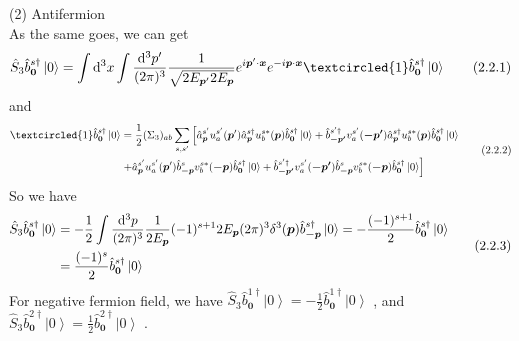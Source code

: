 \documentclass[12pt]{article}
\begin{document}
\begin{spacing}{1.5}
(2) Antifermion \\
As the same goes, we can get\\
\begin{equation}
\hat S_{3}\hat b^{s\dagger}_{\bm0} \left|0\right> = \int\dif^{3}x\int \frac{\dif^{3} p'}{(2\pi)^{3}}\frac{1}{\sqrt{2E_{\bm p'}2E_{\bm p}}}e^{i\bm p' \cdot \bm x}e^{-i\bm p \cdot \bm x} \textcircled{1} \hat b^{s\dagger}_{\bm0} \left|0\right>
	\tag{2.2.1}
\end{equation}
and
\begin{equation}
\begin{aligned}
\textcircled{1}\hat b^{s\dagger}_{\bm0} \left|0\right>  
&= \frac{1}{2}(\Sigma_{3})_{ab} \sum\limits_{s,s'} \left[ { \hat a^{s'}_{\bm p}u^{s'}_{a}(\bm p')\hat a^{s\dagger}_{\bm p}u^{s*}_{b}(\bm p)\hat b^{s\dagger}_{\bm0} \left|0\right>  +\hat b^{s'\dagger}_{\bm{-p'}}v^{s'}_{a}(\bm{-p'})\hat a^{s\dagger}_{\bm p}u^{s*}_{b}(\bm p)\hat b^{s\dagger}_{\bm0} \left|0\right> } \right. \\ & \left. { + \hat a^{s'}_{\bm p}u^{s'}_{a}(\bm p')\hat b^{s}_{\bm{-p}}v^{s*}_{b}(\bm{-p})\hat b^{s\dagger}_{\bm0} \left|0\right> +\hat b^{s'\dagger}_{\bm{-p'}}v^{s'}_{a}(\bm{-p'})\hat b^{s}_{\bm{-p}}v^{s*}_{b}(\bm{-p})\hat b^{s\dagger}_{\bm0} \left|0\right> } \right] 
\end{aligned}
	\tag{2.2.2}
\end{equation}
So we have
\begin{equation}
\begin{aligned}
\hat S_{3}\hat b^{s\dagger}_{\bm0} \left|0\right> &= -\frac{1}{2} \int \frac{\mathop{}\!\mathrm{d}^{3} p}{(2\pi)^{3}}\frac{1}{2E_{\bm p}} (-1)^{s+1}2E_{\bm p}(2\pi)^{3}\delta^{3}(\bm p) \hat b^{s\dagger}_{\bm{-p}} \left|0\right> = -\frac{(-1)^{s+1}}{2}\hat b^{s\dagger}_{\bm 0} \left|0\right> \\
&=\frac{(-1)^{s}}{2}\hat b^{s\dagger}_{\bm 0} \left|0\right>
\end{aligned}
	\tag{2.2.3}
\end{equation}
For negative fermion field, we have $\displaystyle \hat S_{3}\hat b^{1\dagger}_{\bm0} \left|0\right> = -\frac{1}{2} \hat b^{1\dagger}_{\bm0} \left|0\right>$ , and $\displaystyle \hat S_{3}\hat b^{2\dagger}_{\bm0} \left|0\right> = \frac{1}{2} \hat b^{2\dagger}_{\bm0} \left|0\right> $ .\\
~\\
~\\
~\\




\end{spacing}
\end{document}
